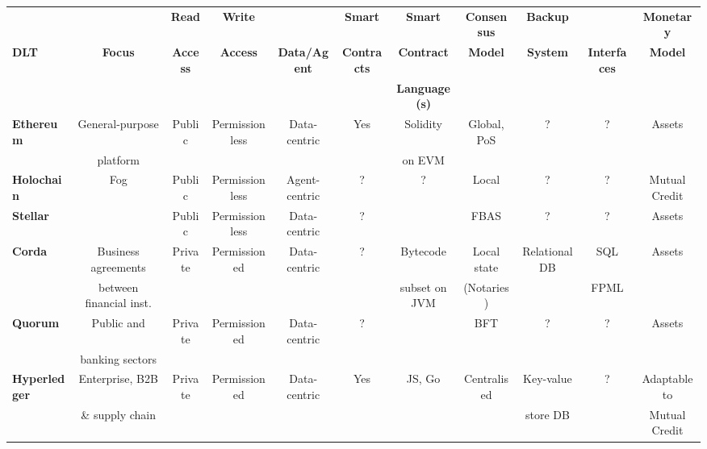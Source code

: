 \begin{table}
\small
\begin{centering}
{\begin{tabular}{| l | c | c | c | c | c | c | c | c | c | c |}
\hline
				& 				& \textbf{Read}			& \textbf{Write}		& \textbf{} 
				& \textbf{Smart}		& \textbf{Smart}			&\textbf{Consensus}
				& \textbf{Backup} 	& \textbf{}				&\textbf{Monetary} \\
\textbf{DLT}		&\textbf{Focus}  	& \textbf{Access} 		& \textbf{Access}	& \textbf{Data/Agent} 
				& \textbf{Contracts} 	& \textbf{Contract}		&\textbf{Model} 
				& \textbf{System} 	& \textbf{Interfaces}		&\textbf{Model} \\
				& 				& \textbf{} 				& \textbf{} 			& \textbf{} 
				& \textbf{} 			& \textbf{Language(s)}	&\textbf{} 
				& \textbf{} 			& \textbf{}				&\textbf{} \\
\hline
\hline
\textbf{Ethereum}	&General-purpose		&Public		&Permissionless	&Data-centric	&Yes		&Solidity	
				&Global, PoS 			&?			&?				&Assets \\
				&platform 				&			&				&			&		&on EVM	
				& 					&			&				& \\
\hline
\textbf{Holochain}	&Fog 				&Public		&Permissionless	&Agent-centric	&?		&?
				&Local 				&?			&?				&Mutual Credit\\
\hline
\textbf{Stellar}		& 					&Public		&Permissionless	&Data-centric	&?		&
				&FBAS 				&?			&?				&Assets\\
\hline
\textbf{Corda} 		&Business agreements	&Private		&Permissioned		&Data-centric	&?		&Bytecode
				&Local state			&Relational DB	&SQL			&Assets\\
		 		&between financial inst.	&			&				&			&		&subset on JVM
				&(Notaries)			&			&FPML			&\\
\hline
\textbf{Quorum} 	&Public and  			&Private		&Permissioned		&Data-centric	&?		&
				&BFT 				&?			&?				&Assets\\
			 	&banking sectors		&			&				&			&		&
				& 					&			&				&\\
\hline
\textbf{Hyperledger}	&Enterprise, B2B		&Private		&Permissioned		&Data-centric	&Yes		&JS, Go
				&Centralised 			&Key-value	&?				&Adaptable to\\
 				& \& supply chain		&			&				&			&		&
				& 					&store DB		&				&Mutual Credit\\
\hline
\end{tabular}}

\vspace{1cm}


\end{centering}
\end{table}

